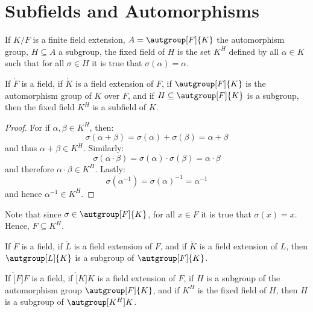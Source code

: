 \documentclass{article}                                                        %
\begin{document}
    \section{Subfields and Automorphisms}
        If $K/F$ is a finite field extension, $A=\autgroup[F]{K}$ the
        automorphism group, $H\subseteq{A}$ a subgroup, the fixed field of $H$
        is the set $K^{H}$ defined by all $\alpha\in{K}$ such that for all
        $\sigma\in{H}$ it is true that $\sigma(\alpha)=\alpha$.
        \begin{theorem}
            If $\ring{F}$ is a field, if $\ring{K}$ is a field extension of $F$,
            if $\autgroup[F]{K}$ is the automorphism group of $K$ over $F$,
            and if $H\subseteq\autgroup[F]{K}$ is a subgroup, then the fixed
            field $K^{H}$ is a subfield of $K$.
        \end{theorem}
        \begin{proof}
            For if $\alpha,\beta\in{K}^{H}$, then:
            \begin{equation}
                \sigma(\alpha+\beta)=\sigma(\alpha)+\sigma(\beta)
                    =\alpha+\beta
            \end{equation}
            and thus $\alpha+\beta\in{K}^{H}$. Similarly:
            \begin{equation}
                \sigma(\alpha\cdot\beta)=\sigma(\alpha)\cdot\sigma(\beta)
                    =\alpha\cdot\beta
            \end{equation}
            and therefore $\alpha\cdot\beta\in{K}^{H}$. Lastly:
            \begin{equation}
                \sigma(\alpha^{\minus{1}})=\sigma(\alpha)^{\minus{1}}
                    =\alpha^{\minus{1}}
            \end{equation}
            and hence $\alpha^{\minus{1}}\in{K}^{H}$.
        \end{proof}
        Note that since $\sigma\in\autgroup[F]{K}$, for all $x\in{F}$ it is true
        that $\sigma(x)=x$. Hence, $F\subseteq{K}^{H}$.
        \begin{theorem}
            If $\ring{F}$ is a field, if $\ring{L}$ is a field extension of
            $F$, and if $\ring{K}$ is a field extension of $L$, then
            $\autgroup[L]{K}$ is a subgroup of $\autgroup[F]{K}$.
        \end{theorem}
        \begin{theorem}
            If $\ring[F]{F}$ is a field, if $\ring[K]{K}$ is a field extension
            of $F$, if $H$ is a subgroup of the automorphism group
            $\autgroup[F]{K}$, and if $K^{H}$ is the fixed field of $H$,
            then $H$ is a subgroup of $\autgroup[K^{H}]{K}$.
        \end{theorem}
\end{document}
